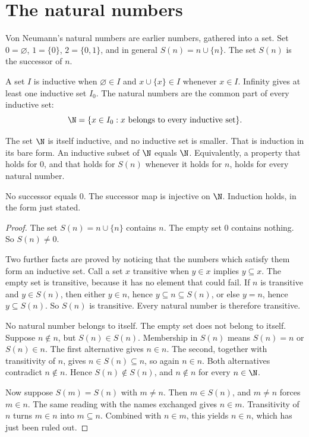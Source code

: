 \section{The natural numbers}\label{sec:naturals}

Von Neumann's natural numbers are earlier numbers, gathered into a set. Set $0=\varnothing$, $1=\{0\}$, $2=\{0,1\}$, and in general $S(n)=n\cup\{n\}$. The set $S(n)$ is the successor of $n$.

\begin{definition}
A set $I$ is inductive when $\varnothing\in I$ and $x\cup\{x\}\in I$ whenever $x\in I$. Infinity gives at least one inductive set $I_0$. The natural numbers are the common part of every inductive set:
\[
\N=\{x\in I_0:x\text{ belongs to every inductive set}\}.
\]
\end{definition}

The set $\N$ is itself inductive, and no inductive set is smaller. That is induction in its bare form. An inductive subset of $\N$ equals $\N$. Equivalently, a property that holds for $0$, and that holds for $S(n)$ whenever it holds for $n$, holds for every natural number.

\begin{theorem}\label{thm:peano}
No successor equals $0$. The successor map is injective on $\N$. Induction holds, in the form just stated.
\end{theorem}
\begin{proof}
The set $S(n)=n\cup\{n\}$ contains $n$. The empty set $0$ contains nothing. So $S(n)\ne 0$.

Two further facts are proved by noticing that the numbers which satisfy them form an inductive set. Call a set $x$ transitive when $y\in x$ implies $y\subseteq x$. The empty set is transitive, because it has no element that could fail. If $n$ is transitive and $y\in S(n)$, then either $y\in n$, hence $y\subseteq n\subseteq S(n)$, or else $y=n$, hence $y\subseteq S(n)$. So $S(n)$ is transitive. Every natural number is therefore transitive.

No natural number belongs to itself. The empty set does not belong to itself. Suppose $n\notin n$, but $S(n)\in S(n)$. Membership in $S(n)$ means $S(n)=n$ or $S(n)\in n$. The first alternative gives $n\in n$. The second, together with transitivity of $n$, gives $n\in S(n)\subseteq n$, so again $n\in n$. Both alternatives contradict $n\notin n$. Hence $S(n)\notin S(n)$, and $n\notin n$ for every $n\in\N$.

Now suppose $S(m)=S(n)$ with $m\ne n$. Then $m\in S(n)$, and $m\ne n$ forces $m\in n$. The same reading with the names exchanged gives $n\in m$. Transitivity of $n$ turns $m\in n$ into $m\subseteq n$. Combined with $n\in m$, this yields $n\in n$, which has just been ruled out.
\end{proof}

